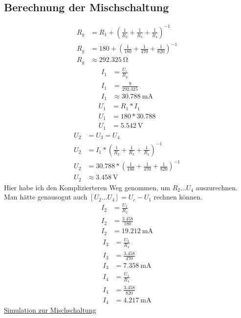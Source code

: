 \documentclass[12pt,a4paper]{amsart}
\begin{document}
\subsection{Berechnung der Mischschaltung}
\begin{align*}
  R_g&=R_1+\left(\frac{1}{R_2}+\frac{1}{R_3}+\frac{1}{R_4}\right)^{-1}\\
  R_g&=180+\left(\frac{1}{180}+\frac{1}{470}+\frac{1}{820}\right)^{-1}\\
  R_g&\approx\qty{292.325}{\ohm}
\end{align*}
\begin{align*}
  I_1&=\frac{U_e}{R_g}\\
  I_1&=\frac{9}{292.325}\\
  I_1&\approx\qty{30.788}{\mA}
\end{align*}
\begin{align*}
  U_1&=R_1*I_1\\
  U_1&=180*30.788\\
  U_1&=\qty{5.542}{\volt}
\end{align*}
\begin{align*}
  U_2&=U_3=U_4\\
  U_2&=I_1*\left(\frac{1}{R_2}+\frac{1}{R_3}+\frac{1}{R_4}\right)^{-1}\\
  U_2&=30.788*\left(\frac{1}{180}+\frac{1}{470}+\frac{1}{820}\right)^{-1}\\
  U_2&\approx\qty{3.458}{\volt}
\end{align*}
Hier habe ich den Komplizierteren Weg genommen, um $R_2 \dots U_4$ auszurechnen.\\
Man hätte genausogut auch $[U_2 \dots U_4]=U_e-U_1$ rechnen können.
\begin{align*}
  I_2&=\frac{U_2}{R_2}\\
  I_2&=\frac{3.458}{180}\\
  I_2&=\qty{19.212}{\mA}
\end{align*}
\begin{align*}
  I_3&=\frac{U_3}{R_3}\\
  I_3&=\frac{3.458}{470}\\
  I_3&=\qty{7.358}{\mA}
\end{align*}
\begin{align*}
  I_4&=\frac{U_4}{R_4}\\
  I_4&=\frac{3.458}{820}\\
  I_4&=\qty{4.217}{\mA}
\end{align*}
\href{https://www.falstad.com/circuit/circuitjs.html?ctz=CQAgjCAMB0l3BWK0xgMxrAFgBxYWpAGxE4BMRaIA7FUlnQKYC0qAUAG4hFYhp7deATiJQxWSCCFjJMBGwBO4LL1Rllqoeslgc8SIo0gyCUdl5oE28HrZpqOlccg4jJszMNlq698Z98VuIOhhKSfmGB1jhgQtBCCYlJiXYOIJFkLulwxqbgnvbhAZmu3r55ELJsAA7gWrlm9ZbqlVA1fJkNHZLN+VW1KqV5g1F9bQDubhX1fgaT5qOx6r1z-stBaJ0rbJNlXZvheasZw7hdxzm9I9vzTiVrzq4X4Vl796t7vZ8Cz6OR-LwPgEAUYQasFr0IT8dqCBDw+NDCoIpGYnCIxuCnEs6i16pjVGBcS1CRMjGojOiDLVseSafVWvicW4sgYkf8BN9VJ4gA}{Simulation zur Mischschaltung}
\end{document}
